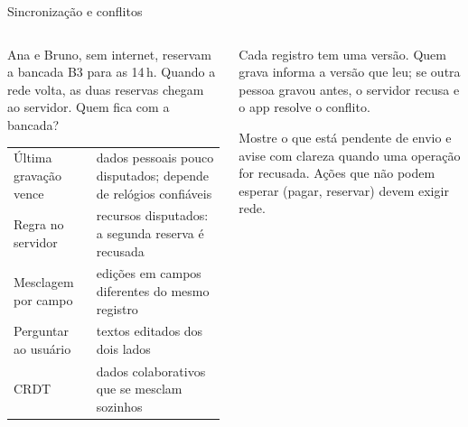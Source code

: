 \begin{frame}{Sincronização e conflitos}
  \begin{columns}[T]
    \begin{column}{0.52\textwidth}
      \begin{exemplo}[O conflito]
        Ana e Bruno, sem internet, reservam a bancada B3 para as 14\,h. Quando a rede volta, as duas reservas chegam ao servidor. Quem fica com a bancada?
      \end{exemplo}
      \scriptsize
      \begin{tabularx}{\linewidth}{@{}l L@{}}
        \toprule
         &  \\
        \midrule
        Última gravação vence & dados pessoais pouco disputados; depende de relógios confiáveis \\
        Regra no servidor & recursos disputados: a segunda reserva é recusada \\
        Mesclagem por campo & edições em campos diferentes do mesmo registro \\
        Perguntar ao usuário & textos editados dos dois lados \\
        CRDT & dados colaborativos que se mesclam sozinhos \\
        \bottomrule
      \end{tabularx}
    \end{column}
    \begin{column}{0.46\textwidth}
      \begin{definicao}
        Cada registro tem uma versão. Quem grava informa a versão que leu; se outra pessoa gravou antes, o servidor recusa e o app resolve o conflito.
      \end{definicao}
      \begin{dica}[Na interface]
        Mostre o que está pendente de envio e avise com clareza quando uma operação for recusada. Ações que não podem esperar (pagar, reservar) devem exigir rede.
      \end{dica}
    \end{column}
  \end{columns}
\end{frame}

